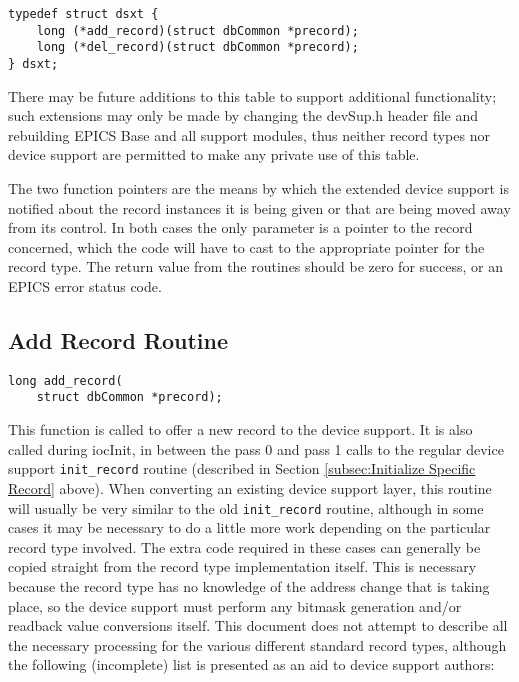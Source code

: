 \begin{verbatim}
typedef struct dsxt {
    long (*add_record)(struct dbCommon *precord);
    long (*del_record)(struct dbCommon *precord);
} dsxt;
\end{verbatim}

There may be future additions to this table to support additional functionality; such extensions may only be made by changing the devSup.h header file and rebuilding EPICS Base and all support modules, thus neither record types nor device support are permitted to make any private use of this table.

The two function pointers are the means by which the extended device support is notified about the record instances it is being given or that are being moved away from its control.
In both cases the only parameter is a pointer to the record concerned, which the code will have to cast to the appropriate pointer for the record type.
The return value from the routines should be zero for success, or an EPICS error status code.

\subsection{Add Record Routine}

\begin{verbatim}
long add_record(
    struct dbCommon *precord);
\end{verbatim}

This function is called to offer a new record to the device support.
It is also called during iocInit, in between the pass 0 and pass 1 calls to the regular device support \verb|init_record| routine (described in Section \ref{subsec:Initialize Specific Record} above).
When converting an existing device support layer, this routine will usually be very similar to the old \verb|init_record| routine, although in some cases it may be necessary to do a little more work depending on the particular record type involved.
The extra code required in these cases can generally be copied straight from the record type implementation itself.
This is necessary because the record type has no knowledge of the address change that is taking place, so the device support must perform any bitmask generation and/or readback value conversions itself.
This document does not attempt to describe all the necessary processing for the various different standard record types, although the following (incomplete) list is presented as an aid to device support authors:

